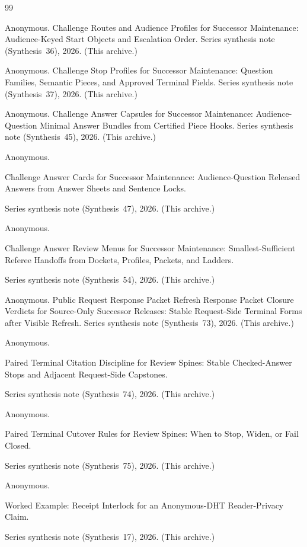 \documentclass[11pt]{article}
\begin{document}
\begin{thebibliography}{99}\small

Anonymous.
\newblock Challenge Routes and Audience Profiles for Successor Maintenance: Audience-Keyed Start Objects and Escalation Order.
\newblock Series synthesis note (Synthesis~36), 2026. (This archive.)

Anonymous.
\newblock Challenge Stop Profiles for Successor Maintenance: Question Families, Semantic Pieces, and Approved Terminal Fields.
\newblock Series synthesis note (Synthesis~37), 2026. (This archive.)

Anonymous.
\newblock Challenge Answer Capsules for Successor Maintenance: Audience-Question Minimal Answer Bundles from Certified Piece Hooks.
\newblock Series synthesis note (Synthesis~45), 2026. (This archive.)

Anonymous.

\newblock Challenge Answer Cards for Successor Maintenance: Audience-Question Released Answers from Answer Sheets and Sentence Locks.

\newblock Series synthesis note (Synthesis~47), 2026. (This archive.)

Anonymous.

\newblock Challenge Answer Review Menus for Successor Maintenance: Smallest-Sufficient Referee Handoffs from Dockets, Profiles, Packets, and Ladders.

\newblock Series synthesis note (Synthesis~54), 2026. (This archive.)

Anonymous.
\newblock Public Request Response Packet Refresh Response Packet Closure Verdicts for Source-Only Successor Releases: Stable Request-Side Terminal Forms after Visible Refresh.
\newblock Series synthesis note (Synthesis~73), 2026. (This archive.)

Anonymous.

\newblock Paired Terminal Citation Discipline for Review Spines: Stable Checked-Answer Stops and Adjacent Request-Side Capstones.

\newblock Series synthesis note (Synthesis~74), 2026. (This archive.)

Anonymous.

\newblock Paired Terminal Cutover Rules for Review Spines: When to Stop, Widen, or Fail Closed.

\newblock Series synthesis note (Synthesis~75), 2026. (This archive.)

Anonymous.

\newblock Worked Example: Receipt Interlock for an Anonymous-DHT Reader-Privacy Claim.

\newblock Series synthesis note (Synthesis~17), 2026. (This archive.)

\end{thebibliography}
\end{document}
